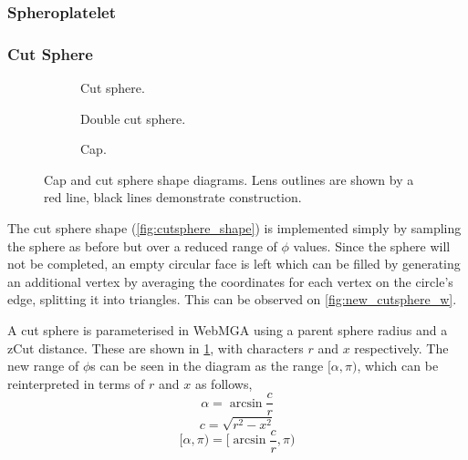 \subsubsection{Spheroplatelet}

\subsubsection{Cut Sphere}
\label{cut_sphere_section}
\begin{figure}
  \begin{center}
    \begin{subfigure}{0.3\textwidth}
      
      \caption{Cut sphere.}
      \label{fig:cut_sphere_diagram}
    \end{subfigure}
    \begin{subfigure}{0.3\textwidth}
      
      \caption{Double cut sphere.}
      \label{fig:double_cut_diagram}
    \end{subfigure}
    \begin{subfigure}{0.3\textwidth}
      
      \caption{Cap.}
      \label{fig:cap_diagram}
    \end{subfigure}
  \end{center}
  \caption{Cap and cut sphere shape diagrams. Lens outlines are shown by a red line, black lines demonstrate construction.}
  \label{fig:cap_cut_descriptions}
\end{figure}
The cut sphere shape (\cref{fig:cutsphere_shape}) is implemented simply by sampling the sphere as before but over a reduced range of $\phi$ values. Since the sphere will not be completed, an empty circular face is left which can be filled by generating an additional vertex by averaging the coordinates for each vertex on the circle's edge, splitting it into triangles. This can be observed on \cref{fig:new_cutsphere_w}.

A cut sphere is parameterised in WebMGA using a parent sphere radius and a zCut distance. These are shown in \cref{fig:cut_sphere_diagram}, with characters $r$ and $x$ respectively. The new range of $\phi$s can be seen in the diagram as the range $[\alpha,\pi)$, which can be reinterpreted in terms of $r$ and $x$ as follows,
\begin{equation}
\alpha=\arcsin\frac{c}{r}
\end{equation}
\begin{equation}
c=\sqrt{r^2-x^2}
\end{equation}
\begin{equation}
[\alpha,\pi)=[\arcsin\frac{c}{r},\pi)
\end{equation}

